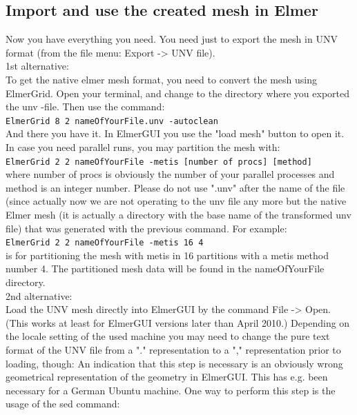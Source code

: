 \subsection{Import and use the created mesh in Elmer}

Now you have everything you need. You need just to export the mesh in UNV format (from the file menu: Export -> UNV file).\\

\noindent 1st alternative:\\

To get the native elmer mesh format, you need to convert the mesh using ElmerGrid. Open your terminal, and change to the directory where you exported the unv -file. Then use the command:\\

\texttt{ElmerGrid 8 2 nameOfYourFile.unv -autoclean}\\

\noindent And there you have it. In ElmerGUI you use the "load mesh" button to open it.  In case you need parallel runs, you may partition the mesh with:\\

\texttt{ElmerGrid 2 2 nameOfYourFile -metis [number of procs] [method]}\\

where number of procs is obviously the number of your parallel processes and method is an integer number. Please do not use ".unv" after the name of the file (since actually now we are not operating to the unv file any more but the native Elmer mesh (it is actually a directory with the base name of the transformed unv file) that was generated with the previous command. For example:\\

\texttt{ElmerGrid 2 2 nameOfYourFile -metis 16 4}\\

is for partitioning the mesh with metis in 16 partitions with a metis method number 4. The partitioned mesh data will be found in the nameOfYourFile directory.\\

\noindent 2nd alternative:\\

Load the UNV mesh directly into ElmerGUI by the command File -> Open. (This works at least for ElmerGUI versions later than April 2010.) Depending on the locale setting of the used machine you may need to change the pure text format of the UNV file from a "." representation to a "," representation prior to loading, though: An indication that this step is necessary is an obviously wrong geometrical representation of the geometry in ElmerGUI. This has e.g. been necessary for a German Ubuntu machine. One way to perform this step is the usage of the sed command:\\

